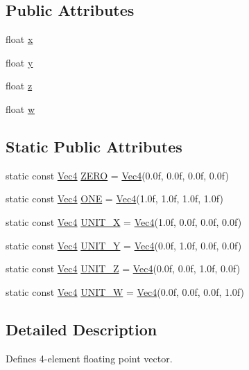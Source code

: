 \subsection*{Public Attributes}
\begin{DoxyCompactItemize}
\item 
float \hyperlink{classVec4_a3d9a7d18ac661965798b0c5bc32c56df}{x}
\item 
float \hyperlink{classVec4_a21c69aa0ef01a4ea985966c5527bbd69}{y}
\item 
float \hyperlink{classVec4_a60d0b599c7104dd0c6e2ae0cc4cd0310}{z}
\item 
float \hyperlink{classVec4_a37bee38ceffb78ccd3875ebf82bd84b2}{w}
\end{DoxyCompactItemize}
\subsection*{Static Public Attributes}
\begin{DoxyCompactItemize}
\item 
static const \hyperlink{classVec4}{Vec4} \hyperlink{classVec4_aaa988d97a0789befa6e14f3c9a9675e4}{Z\+E\+RO} = \hyperlink{classVec4}{Vec4}(0.\+0f, 0.\+0f, 0.\+0f, 0.\+0f)
\item 
static const \hyperlink{classVec4}{Vec4} \hyperlink{classVec4_a126cf96ce29901448345494628201e0e}{O\+NE} = \hyperlink{classVec4}{Vec4}(1.\+0f, 1.\+0f, 1.\+0f, 1.\+0f)
\item 
static const \hyperlink{classVec4}{Vec4} \hyperlink{classVec4_a3b96b984323af169bf8b401326be367b}{U\+N\+I\+T\+\_\+X} = \hyperlink{classVec4}{Vec4}(1.\+0f, 0.\+0f, 0.\+0f, 0.\+0f)
\item 
static const \hyperlink{classVec4}{Vec4} \hyperlink{classVec4_a13926e9e63a4875d69b2f54207143a0f}{U\+N\+I\+T\+\_\+Y} = \hyperlink{classVec4}{Vec4}(0.\+0f, 1.\+0f, 0.\+0f, 0.\+0f)
\item 
static const \hyperlink{classVec4}{Vec4} \hyperlink{classVec4_a12848e3af6852f84795922f3ffc36605}{U\+N\+I\+T\+\_\+Z} = \hyperlink{classVec4}{Vec4}(0.\+0f, 0.\+0f, 1.\+0f, 0.\+0f)
\item 
static const \hyperlink{classVec4}{Vec4} \hyperlink{classVec4_a4e53a78444c8d5ddbd17e9695deb0ed7}{U\+N\+I\+T\+\_\+W} = \hyperlink{classVec4}{Vec4}(0.\+0f, 0.\+0f, 0.\+0f, 1.\+0f)
\end{DoxyCompactItemize}


\subsection{Detailed Description}
Defines 4-\/element floating point vector. 

